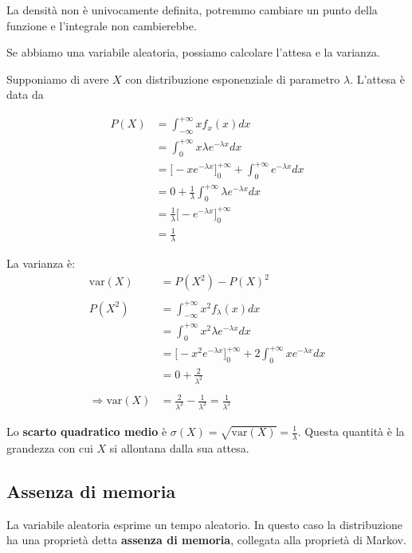 \documentclass[a4paper,12pt]{book}
\newcommand\ddfrac[2]{\frac{\displaystyle #1}{\displaystyle #2}}
\begin{document}
La densità non è univocamente definita, potremmo cambiare un punto della funzione e l'integrale non cambierebbe. 

Se abbiamo una variabile aleatoria, possiamo calcolare l'attesa e la varianza. 

Supponiamo di avere $ X $ con distribuzione esponenziale di parametro $\lambda$. L'attesa è data da 

\begin{align*}
	P(X) & = \int_{-\infty}^{+\infty} x f_x(x) dx \\
	& = \int_{0}^{+\infty}x \lambda e ^{-\lambda x}dx \\
	& = \bigg[-xe^{-\lambda x} \bigg]_0^{+\infty} + \int_{0}^{+\infty} e ^{-\lambda x}dx  \\
	& = 0 + \frac{1}{\lambda}\int_{0}^{+\infty} \lambda e^{-\lambda x} dx \\
	& = \frac{1}{\lambda}\bigg[-e^{-\lambda x} \bigg]_0^{+\infty} \\
	& = \frac{1}{\lambda}
\end{align*}

La varianza è:
\begin{align*}
	\text{var}(X) & = P(X^2) - P(X)^2 \\
	\\
	P(X^2) & = \int_{-\infty}^{+\infty} x^2 f_\lambda(x) dx \\
	& = \int_{0}^{+\infty} x^2 \lambda e^{-\lambda x} dx \\
	& = \bigg[-x^2e^{-\lambda x} \bigg]_0^{+\infty} + 2\int_0^{+\infty} x e^{-\lambda x} dx \\
	& = 0 + \frac{2}{\lambda^2} \\
	\\
	\Rightarrow \text{var}(X) & = \frac{2}{\lambda^2} - \frac{1}{\lambda^2} = \frac{1}{\lambda^2}
\end{align*}

Lo \textbf{scarto quadratico medio} è $\sigma(X) = \sqrt{\text{var}(X)} = \ddfrac{1}{\lambda}$. %
Questa quantità è la grandezza con cui $ X $ si allontana dalla sua attesa. 

\subsection{Assenza di memoria}

La variabile aleatoria esprime un tempo aleatorio. In questo caso la distribuzione ha una proprietà detta \textbf{assenza di memoria}, collegata alla proprietà di Markov. 
\end{document}
